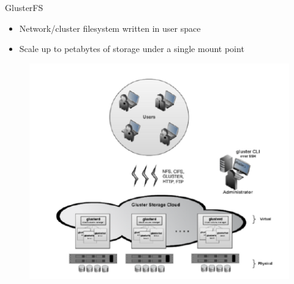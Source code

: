 \documentclass{beamer}
\begin{document}
\begin{frame}{GlusterFS}
	\begin{itemize}
		\item Network/cluster filesystem written in user space
		\item Scale up to petabytes of storage under a single mount point
	\end{itemize}
	\begin{figure}[h]
		\centering
		\includegraphics[width=0.7\linewidth]{scheme.png}
	\end{figure}
\end{frame}
\end{document}
